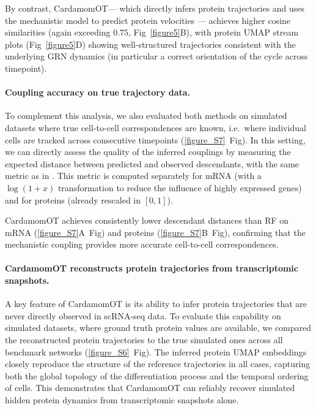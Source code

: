 \documentclass[a4paper, 11pt]{article}
\theoremstyle{plain}
\theoremstyle{remark}
\begin{document}
By contrast, CardamomOT— which directly infers protein trajectories
and uses the mechanistic model to predict protein velocities — achieves
higher cosine similarities (again exceeding $0.75$, Fig~\ref{figure5}B), with
protein UMAP stream plots (Fig~\ref{figure5}D) showing well-structured trajectories
consistent with the underlying GRN dynamics (in particular a correct orientation of the cycle across timepoint).

\paragraph{Coupling accuracy on true trajectory data.}

To complement this analysis, we also evaluated both methods on simulated datasets where
true cell-to-cell correspondences are known, i.e.\ where individual cells are tracked
across consecutive timepoints (\ref{figure_S7}~Fig). In this
setting, we can directly assess the quality of the inferred couplings by measuring the
expected distance between predicted and observed descendants, with the same metric as in \cite{forrow2021lineageot}. This metric is computed separately for mRNA (with a $\log(1+x)$ transformation to reduce the influence of highly expressed genes) and for proteins (already rescaled in $[0,1]$).

CardamomOT achieves consistently lower descendant distances than RF on mRNA (\ref{figure_S7}A~Fig) and proteins (\ref{figure_S7}B~Fig), confirming that the mechanistic coupling provides more accurate cell-to-cell correspondences. 

\paragraph{CardamomOT reconstructs protein trajectories from transcriptomic snapshots.}
A key feature of CardamomOT is its ability to infer protein trajectories that are 
never directly observed in scRNA-seq data. To evaluate this capability on simulated 
datasets, where ground truth protein values are available, we compared the 
reconstructed protein trajectories to the true simulated ones across all benchmark networks (\ref{figure_S6}~Fig). The inferred protein UMAP embeddings 
closely reproduce the structure of the reference trajectories in all cases, capturing 
both the global topology of the differentiation process and the temporal ordering of 
cells. This demonstrates that CardamomOT can reliably recover simulated hidden protein dynamics 
from transcriptomic snapshots alone.
\end{document}
